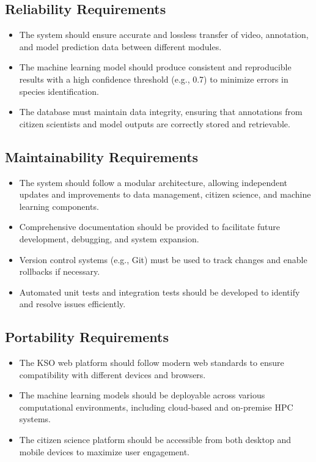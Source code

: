 \subsection{Reliability Requirements}
\begin{itemize}
    \item The system should ensure accurate and lossless transfer of video, annotation, and model prediction data between different modules.
    \item The machine learning model should produce consistent and reproducible results with a high confidence threshold (e.g., 0.7) to minimize errors in species identification.
    \item The database must maintain data integrity, ensuring that annotations from citizen scientists and model outputs are correctly stored and retrievable.
\end{itemize}

\subsection{Maintainability Requirements}
\begin{itemize}
    \item The system should follow a modular architecture, allowing independent updates and improvements to data management, citizen science, and machine learning components.
    \item Comprehensive documentation should be provided to facilitate future development, debugging, and system expansion.
    \item Version control systems (e.g., Git) must be used to track changes and enable rollbacks if necessary.
    \item Automated unit tests and integration tests should be developed to identify and resolve issues efficiently.
\end{itemize}

\subsection{Portability Requirements}
\begin{itemize}
    \item The KSO web platform should follow modern web standards to ensure compatibility with different devices and browsers.
    \item The machine learning models should be deployable across various computational environments, including cloud-based and on-premise HPC systems.
    \item The citizen science platform should be accessible from both desktop and mobile devices to maximize user engagement.
\end{itemize}

